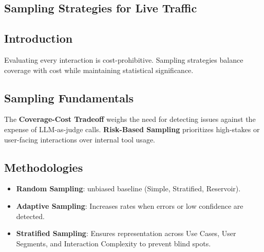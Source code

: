 \begin{TNtwocol}
\section{Sampling Strategies for Live Traffic }
\subsection{Introduction}
Evaluating every interaction is cost-prohibitive. Sampling strategies balance coverage with cost while maintaining statistical significance.

\subsection{Sampling Fundamentals}
The \textbf{Coverage-Cost Tradeoff} weighs the need for detecting issues against the expense of LLM-as-judge calls. \textbf{Risk-Based Sampling} prioritizes high-stakes or user-facing interactions over internal tool usage.

\subsection{Methodologies}
\begin{itemize}
    \item \textbf{Random Sampling}: unbiased baseline (Simple, Stratified, Reservoir).
    \item \textbf{Adaptive Sampling}: Increases rates when errors or low confidence are detected.
    \item \textbf{Stratified Sampling}: Ensures representation across Use Cases, User Segments, and Interaction Complexity to prevent blind spots.
\end{itemize}
\end{TNtwocol}
